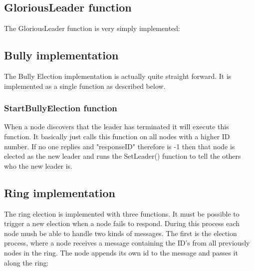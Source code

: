 \subsection{GloriousLeader function}
The GloriousLeader function is very simply implemented:

\begin{center}
\end{center}


\subsection{Bully implementation}
The Bully Election implementation is actually quite straight forward. It is implemented as a single function as described below.

\subsubsection{StartBullyElection function}
When a node discovers that the leader has terminated it will execute this function. It basically just calls this function on all nodes with a higher ID number. If no one replies and "responseID" therefore is -1 then that node is elected as the new leader and runs the SetLeader() function to tell the others who the new leader is. 

\begin{center}
\end{center}

\subsection{Ring implementation}
The ring election is implemented with three functions. It must be possible to trigger a new election when a node fails to respond. During this process each node mush be able to handle two kinds of messages. The first is the election process, where a node receives a message containing the ID's from all previously nodes in the ring. The node appends its own id to the message and passes it along the ring:

\begin{center}
\end{center}

